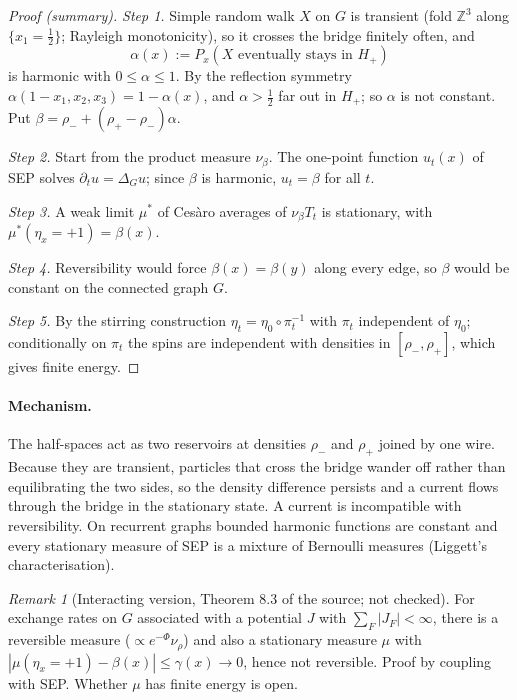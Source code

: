 \documentclass[11pt]{article}
\theoremstyle{remark}\newtheorem*{remark}{Remark}
\newcommand{\Z}{\mathbb{Z}}
\begin{document}
\begin{proof}[Proof (summary)]
\emph{Step 1.} Simple random walk $X$ on $G$ is transient (fold $\Z^3$ along $\{x_1=\frac12\}$; Rayleigh monotonicity), so it crosses the bridge finitely often, and\[\alpha(x):=P_x(X\text{ eventually stays in }H_+)\]is harmonic with $0\le\alpha\le1$. By the reflection symmetry $\alpha(1-x_1,x_2,x_3)=1-\alpha(x)$, and $\alpha>\frac12$ far out in $H_+$; so $\alpha$ is not constant. Put $\beta=\rho_-+(\rho_+-\rho_-)\alpha$.

\emph{Step 2.} Start from the product measure $\nu_\beta$. The one-point function $u_t(x)$ of SEP solves $\partial_t u=\Delta_G u$; since $\beta$ is harmonic, $u_t=\beta$ for all $t$.

\emph{Step 3.} A weak limit $\mu^*$ of Ces\`aro averages of $\nu_\beta T_t$ is stationary, with $\mu^*(\eta_x=+1)=\beta(x)$.

\emph{Step 4.} Reversibility would force $\beta(x)=\beta(y)$ along every edge, so $\beta$ would be constant on the connected graph $G$.

\emph{Step 5.} By the stirring construction $\eta_t=\eta_0\circ\pi_t^{-1}$ with $\pi_t$ independent of $\eta_0$; conditionally on $\pi_t$ the spins are independent with densities in $[\rho_-,\rho_+]$, which gives finite energy.
\end{proof}

\paragraph{Mechanism.} The half-spaces act as two reservoirs at densities $\rho_-$ and $\rho_+$ joined by one wire. Because they are transient, particles that cross the bridge wander off rather than equilibrating the two sides, so the density difference persists and a current flows through the bridge in the stationary state. A current is incompatible with reversibility. On recurrent graphs bounded harmonic functions are constant and every stationary measure of SEP is a mixture of Bernoulli measures (Liggett's characterisation).

\begin{remark}[Interacting version, Theorem 8.3 of the source; not checked]
For exchange rates on $G$ associated with a potential $J$ with $\sum_F|J_F|<\infty$, there is a reversible measure ($\propto e^{-\Phi}\nu_\rho$) and also a stationary measure $\mu$ with $|\mu(\eta_x=+1)-\beta(x)|\le\gamma(x)\to0$, hence not reversible. Proof by coupling with SEP. Whether $\mu$ has finite energy is open.
\end{remark}
\end{document}
